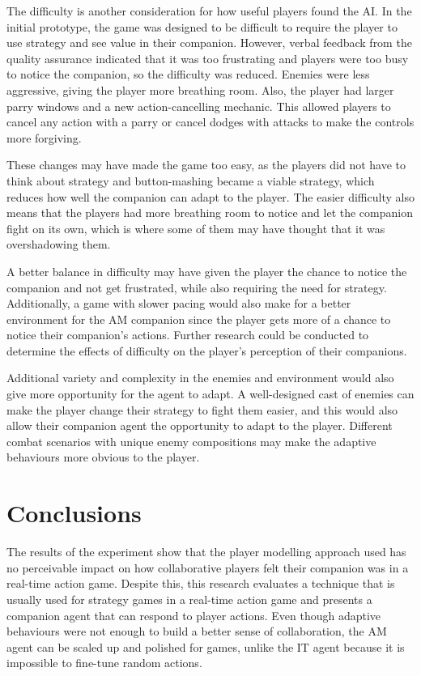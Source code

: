 \documentclass{IEEEtran}
\begin{document}
The difficulty is another consideration for how useful players found the AI. In the initial prototype, the game was designed to be difficult to require the player to use strategy and see value in their companion. However, verbal feedback from the quality assurance indicated that it was too frustrating and players were too busy to notice the companion, so the difficulty was reduced. Enemies were less aggressive, giving the player more breathing room. Also, the player had larger parry windows and a new action-cancelling mechanic. This allowed players to cancel any action with a parry or cancel dodges with attacks to make the controls more forgiving.

These changes may have made the game too easy, as the players did not have to think about strategy and button-mashing became a viable strategy, which reduces how well the companion can adapt to the player. The easier difficulty also means that the players had more breathing room to notice and let the companion fight on its own, which is where some of them may have thought that it was overshadowing them.

A better balance in difficulty may have given the player the chance to notice the companion and not get frustrated, while also requiring the need for strategy. Additionally, a game with slower pacing would also make for a better environment for the AM companion since the player gets more of a chance to notice their companion’s actions. Further research could be conducted to determine the effects of difficulty on the player’s perception of their companions.

Additional variety and complexity in the enemies and environment would also give more opportunity for the agent to adapt. A well-designed cast of enemies can make the player change their strategy to fight them easier, and this would also allow their companion agent the opportunity to adapt to the player. Different combat scenarios with unique enemy compositions may make the adaptive behaviours more obvious to the player.

\section{Conclusions}
\label{Conclusions}

The results of the experiment show that the player modelling approach used has no perceivable impact on how collaborative players felt their companion was in a real-time action game. Despite this, this research evaluates a technique that is usually used for strategy games in a real-time action game and presents a companion agent that can respond to player actions. Even though adaptive behaviours were not enough to build a better sense of collaboration, the AM agent can be scaled up and polished for games, unlike the IT agent because it is impossible to fine-tune random actions.
\end{document}

